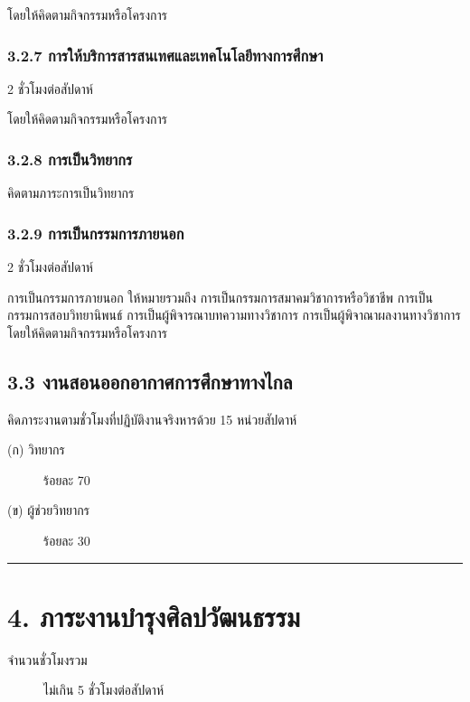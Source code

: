 \documentclass[a4paper,12pt,english]{sphinxmanual}
\begin{document}
โดยให้คิดตามกิจกรรมหรือโครงการ


\subsubsection{3.2.7  การให้บริการสารสนเทศและเทคโนโลยีทางการศึกษา}
\label{\detokenize{workload_rubric:id69}}
2 ชั่วโมงต่อสัปดาห์

โดยให้คิดตามกิจกรรมหรือโครงการ


\subsubsection{3.2.8  การเป็นวิทยากร}
\label{\detokenize{workload_rubric:id70}}
คิดตามภาระการเป็นวิทยากร


\subsubsection{3.2.9 การเป็นกรรมการภายนอก}
\label{\detokenize{workload_rubric:id71}}
2 ชั่วโมงต่อสัปดาห์

การเป็นกรรมการภายนอก ให้หมายรวมถึง การเป็นกรรมการสมาคมวิชาการหรือวิชาชีพ การเป็นกรรมการสอบวิทยานิพนธ์ การเป็นผู้พิจารณาบทความทางวิชาการ การเป็นผู้พิจาณาผลงานทางวิชาการ โดยให้คิดตามกิจกรรมหรือโครงการ


\subsection{3.3 งานสอนออกอากาศการศึกษาทางไกล}
\label{\detokenize{workload_rubric:id72}}
คิดภาระงานตามชั่วโมงที่ปฏิบัติงานจริงหารด้วย 15 หน่วยสัปดาห์
\begin{description}
\item[{(ก)  วิทยากร}] \leavevmode
ร้อยละ 70

\item[{(ข)  ผู้ช่วยวิทยากร}] \leavevmode
ร้อยละ 30

\end{description}


\bigskip\hrule\bigskip



\section{4. ภาระงานบำรุงศิลปวัฒนธรรม}
\label{\detokenize{workload_rubric:id73}}\begin{description}
\item[{จำนวนชั่วโมงรวม}] \leavevmode
ไม่เกิน 5 ชั่วโมงต่อสัปดาห์

\end{description}
\end{document}
